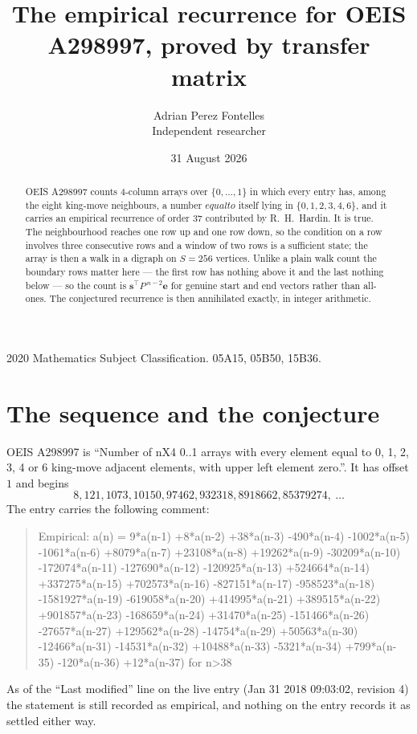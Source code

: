 \documentclass[11pt,a4paper]{article}
\title{The empirical recurrence for OEIS A298997, proved by transfer matrix}
\author{Adrian Perez Fontelles\\ \small Independent researcher}
\date{31 August 2026}
\theoremstyle{plain}
\theoremstyle{definition}
\begin{document}
\maketitle

\begin{abstract}
OEIS A298997 counts $4$-column arrays over $\{0,\dots,1\}$ in which every entry has,
among the eight king-move neighbours, a number $equal to$ itself lying in $\{0,1,2,3,4,6\}$, and it carries an empirical
recurrence of order $37$ contributed by R.~H.~Hardin. It is true. The neighbourhood
reaches one row up and one row down, so the condition on a row involves three consecutive
rows and a window of two rows is a sufficient state; the array is then a walk in a digraph
on $S=256$ vertices. Unlike a plain walk count the boundary rows matter here --- the first
row has nothing above it and the last nothing below --- so the count is
$\mathbf{s}^{\!\top}P^{\,n-2}\mathbf{e}$ for genuine start and end vectors rather than
all-ones. The conjectured recurrence is then annihilated exactly, in integer arithmetic.
\end{abstract}

\noindent\small 2020 Mathematics Subject Classification. 05A15, 05B50, 15B36.\normalsize

\section{The sequence and the conjecture}

OEIS A298997 is ``Number of nX4 0..1 arrays with every element equal to 0, 1, 2, 3, 4 or 6 king-move adjacent elements, with upper left element zero.''. It has offset
$1$ and begins
\[
8, 121, 1073, 10150, 97462, 932318, 8918662, 85379274,\ \dots
\]
The entry carries the following comment:
\begin{quote}\small
Empirical: a(n) = 9*a(n-1) +8*a(n-2) +38*a(n-3) -490*a(n-4) -1002*a(n-5) -1061*a(n-6) +8079*a(n-7) +23108*a(n-8) +19262*a(n-9) -30209*a(n-10) -172074*a(n-11) -127690*a(n-12) -120925*a(n-13) +524664*a(n-14) +337275*a(n-15) +702573*a(n-16) -827151*a(n-17) -958523*a(n-18) -1581927*a(n-19) -619058*a(n-20) +414995*a(n-21) +389515*a(n-22) +901857*a(n-23) -168659*a(n-24) +31470*a(n-25) -151466*a(n-26) -27657*a(n-27) +129562*a(n-28) -14754*a(n-29) +50563*a(n-30) -12466*a(n-31) -14531*a(n-32) +10488*a(n-33) -5321*a(n-34) +799*a(n-35) -120*a(n-36) +12*a(n-37) for n>38
\end{quote}
As of the ``Last modified'' line on the live entry (Jan 31 2018 09:03:02, revision
4) the statement is still recorded as empirical, and nothing on the entry
records it as settled either way.
\end{document}

